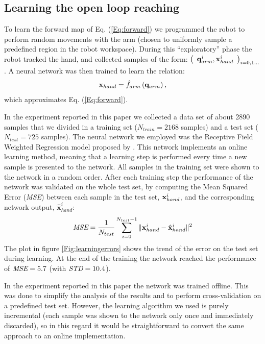 \subsection{Learning the open loop reaching} 
\label{sec:learning-open-loop}
%
To learn the forward map of Eq. (\ref{Eq:forward}) we programmed 
the robot to perform random movements with the arm (chosen to uniformly sample 
a predefined region in the robot workspace). During this ``exploratory'' 
phase the robot tracked the hand, and collected samples of the form: $
%
\left(\begin{array}{cc}
  \qarm^i , \xhand^i\end{array}\right)_{i = 0,1\dots}$.
%
 A neural network was then trained to learn the relation:
%
\begin{equation} 
  \mathbf{x}_{hand}=\hat{f}_{arm}\left(\mathbf q_{arm} \right),
\end{equation}
%
which approximates Eq. (\ref{Eq:forward}).

In the experiment reported in this paper we collected a data set of 
about 2890 samples that we divided in a training set ($N_{train}=2168$
 samples) and 
a test set ($N_{test}=725$ samples). The neural network we employed was the 
Receptive Field Weighted Regression model proposed 
by \cite{schaal98Constructive}. This network implements an online learning
method, meaning that a learning step is performed every time a new 
sample is presented to the network. All samples in the training set were shown
to the network in a random order. After each training step the 
performance of the network was validated on the whole test set, by computing
the Mean Squared Error (\emph{MSE}) between each sample in the test set, 
$\mathbf{x}_{hand}^i$, and the corresponding network output, 
$\mathbf{\hat{x}}_{hand}^i$:
%
\begin{equation}
\emph{MSE}=\frac{1}{N_{test}}\sum_{i=0}^{N_{test}-1}\|\mathbf{x}_{hand}^i- \hat{\mathbf{x}}_{hand}^i\|^2
\end{equation}
%
The plot in figure \ref{Fig:learningerrors}
shows the trend of the error on the test set during learning. At the end of
the training the network reached the performance of $\emph{MSE}=5.7$ 
(with $\emph{STD}=10.4$).

In the experiment reported in this paper the network was trained offline. 
This was done to simplify the analysis of the results and to perform cross-validation 
on a predefined test set. However, the learning algorithm we used is purely 
incremental (each sample was shown to the network only once and immediately 
discarded), so in this regard it would be straightforward to convert the 
same approach to an online implementation.

